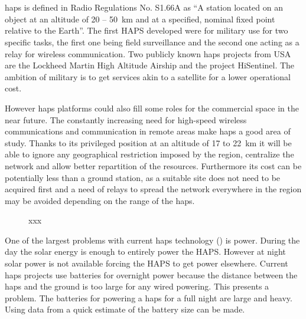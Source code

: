 \section{}
\gls{haps} is defined in \cite{manual:radio_regulation} Radio Regulations No. S1.66A as “A station located on an object
at an altitude of 20 – \SI{50}{km} and at a specified, nominal fixed
point relative to the Earth”.
The first HAPS developed were for military use for two specific tasks, the first one being field surveillance and the second one acting as a relay for wireless communication. 
Two publicly known \gls{haps} projects from USA are the Lockheed Martin High Altitude Airship and the project HiSentinel. The ambition of military is to get services akin to a satellite for a lower operational cost.

However \gls{haps} platforms could also fill some roles for the commercial space in the near future. The constantly increasing need for high-speed wireless communications and communication in remote areas make \gls{haps} a good area of study. 
Thanks to its privileged position at an altitude of 17 to \SI{22}{km} it will be able to ignore any geographical restriction imposed by the region, centralize the network and allow better repartition of the resources. 
Furthermore its cost can  be potentially less than a ground station, as a suitable site does not need to be acquired first and a need of relays to spread the network everywhere in the region may be avoided depending on the range of the \gls{haps}.

\begin{figure} [h]
	\centering
	\caption{xxx}
	\label{fig:XXXX}
\end{figure}


One of the largest problems with current \gls{haps} technology () is power.
During the day the solar energy is enough to entirely power the HAPS.  However at night solar power is not available forcing the HAPS to get power elsewhere. Current \gls{haps} projects use batteries for overnight power because the distance between the \gls{haps} and the ground is too large for any wired powering.
This presents a problem. The batteries for powering a \gls{haps} for a full night are large and heavy. Using data from  a quick estimate of the battery size can be made.

